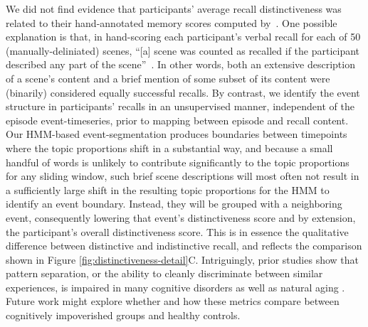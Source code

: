 \documentclass{article}
\begin{document}
We did not find evidence that participants' average recall distinctiveness was related to their hand-annotated memory scores computed by~\cite{ChenEtal17}.  One possible explanation is that, in hand-scoring each participant's verbal recall for each of 50 (manually-deliniated) scenes, ``[a] scene was counted as recalled if the participant described any part of the scene''~\citep{ChenEtal17}.  In other words, both an extensive description of a scene's content and a brief mention of some subset of its content were (binarily) considered equally successful recalls.  By contrast, we identify the event structure in participants' recalls in an unsupervised manner, independent of the episode event-timeseries, prior to mapping between episode and recall content.  Our HMM-based event-segmentation produces boundaries between timepoints where the topic proportions shift in a substantial way, and because a small handful of words is unlikely to contribute significantly to the topic proportions for any sliding window, such brief scene descriptions will most often not result in a sufficiently large shift in the resulting topic proportions for the HMM to identify an event boundary.  Instead, they will be grouped with a neighboring event, consequently lowering that event's distinctiveness score and by extension, the participant's overall distinctiveness score.  This is in essence the qualitative difference between distinctive and indistinctive recall, and reflects the comparison shown in Figure \ref{fig:distinctiveness-detail}C.  Intriguingly, prior studies show that pattern separation, or the ability to cleanly discriminate between similar experiences, is impaired in many cognitive disorders as well as natural aging \citep{StarEtal10, YassEtal11c, YassStar11b}.  Future work might explore whether and how these metrics compare between cognitively impoverished groups and healthy controls.
\end{document}
